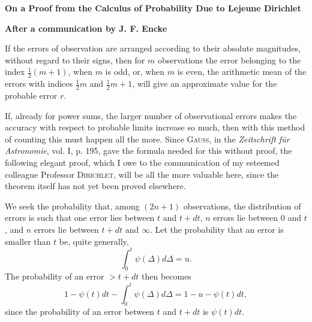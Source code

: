 \documentclass[11pt]{article}
\newcommand{\scn}[1]{\textsc{#1}}
\begin{document}
\begin{center}
{\Large\bfseries On a Proof from the Calculus of Probability Due to Lejeune Dirichlet\par}
\vspace{0.3em}
{\large\bfseries After a communication by J. F. Encke\par}
\vspace{0.8em}
\end{center}

If the errors of observation are arranged according to their absolute magnitudes, without regard to their signs, then for $m$ observations the error belonging to the index $\frac12(m+1)$, when $m$ is odd, or, when $m$ is even, the arithmetic mean of the errors with indices $\frac12m$ and $\frac12m+1$, will give an approximate value for the probable error $r$.

If, already for power sums, the larger number of observational errors makes the accuracy with respect to probable limits increase so much, then with this method of counting this must happen all the more. Since \scn{Gauss}, in the \emph{Zeitschrift für Astronomie}, vol. I, p. 195, gave the formula needed for this without proof, the following elegant proof, which I owe to the communication of my esteemed colleague Professor \scn{Dirichlet}, will be all the more valuable here, since the theorem itself has not yet been proved elsewhere.

We seek the probability that, among $(2n+1)$ observations, the distribution of errors is such that one error lies between $t$ and $t+dt$, $n$ errors lie between $0$ and $t$, and $n$ errors lie between $t+dt$ and $\infty$. Let the probability that an error is smaller than $t$ be, quite generally,
\[
 \int_0^t\psi(\Delta)d\Delta=u.
\]
The probability of an error $>t+dt$ then becomes
\[
 1-\psi(t)dt-\int_0^t\psi(\Delta)d\Delta=1-u-\psi(t)dt,
\]
since the probability of an error between $t$ and $t+dt$ is $\psi(t)dt$.
\end{document}
